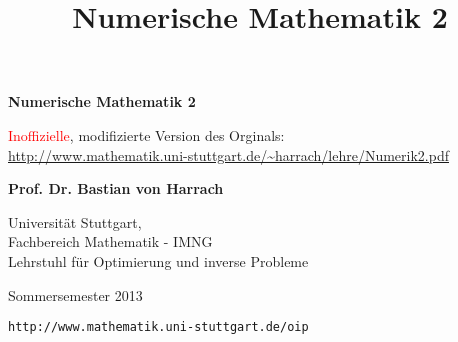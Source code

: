 \documentclass[
]{mycourse}
\title{Numerische Mathematik 2}
\theoremstyle{mythm}
\theoremstyle{break}
\begin{document}
%
%

\begin{titlepage}

	\vspace*{\fill}

\begin{center}
    \textbf{\Huge \sc Numerische Mathematik 2 }

	\vspace{1cm}
	{\Large \textcolor{red}{Inoffizielle}, modifizierte Version des Orginals:} \\
	\url{http://www.mathematik.uni-stuttgart.de/~harrach/lehre/Numerik2.pdf}
\end{center}

\vspace{2cm}

\begin{center}

{\Large \bf Prof. Dr. Bastian von Harrach}

\vspace{1cm}

{\Large Universität Stuttgart,\\[+1ex] Fachbereich Mathematik - IMNG\\[+1ex]
Lehrstuhl für Optimierung und inverse Probleme}

\vspace{1cm}

{\Large Sommersemester 2013}

\vspace{2cm}

{\verb|http://www.mathematik.uni-stuttgart.de/oip|}

\end{center} 

	\vspace*{\fill}
\end{titlepage}


\thispagestyle{empty}
\cleardoublepage
% 
%



\tableofcontents

\cleardoublepage
{}
\end{document}
